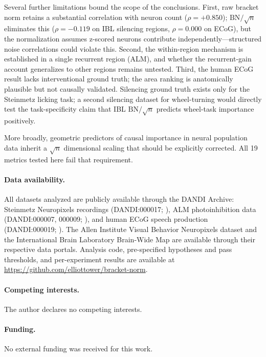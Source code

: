 \documentclass[9pt,lineno]{elife}
\begin{document}
Several further limitations bound the scope of the conclusions. First, raw bracket norm retains a substantial correlation with neuron count ($\rho = +0.850$); $\text{BN}/\!\sqrt{n}$ eliminates this ($\rho = -0.119$ on IBL silencing regions, $\rho = 0.000$ on ECoG), but the normalization assumes z-scored neurons contribute independently---structured noise correlations could violate this. Second, the within-region mechanism is established in a single recurrent region (ALM), and whether the recurrent-gain account generalizes to other regions remains untested. Third, the human ECoG result lacks interventional ground truth; the area ranking is anatomically plausible but not causally validated. Silencing ground truth exists only for the Steinmetz licking task; a second silencing dataset for wheel-turning would directly test the task-specificity claim that IBL $\text{BN}/\!\sqrt{n}$ predicts wheel-task importance positively.

More broadly, geometric predictors of causal importance in neural population data inherit a $\sqrt{n}$ dimensional scaling that should be explicitly corrected. All 19 metrics tested here fail that requirement.

\paragraph{Data availability.} All datasets analyzed are publicly available through the DANDI Archive: Steinmetz Neuropixels recordings (DANDI:000017; \citealp{steinmetz2019distributed, zatkahaas2021}), ALM photoinhibition data (DANDI:000007, 000009; \citealp{svoboda_alm, dandi000007, dandi000009}), and human ECoG speech production (DANDI:000019; \citealp{dandi000019}). The Allen Institute Visual Behavior Neuropixels dataset \citep{siegle2021survey} and the International Brain Laboratory Brain-Wide Map \citep{ibl2025brainwide} are available through their respective data portals. Analysis code, pre-specified hypotheses and pass thresholds, and per-experiment results are available at \url{https://github.com/elliottower/bracket-norm}.

\paragraph{Competing interests.} The author declares no competing interests.

\paragraph{Funding.} No external funding was received for this work.
\end{document}
